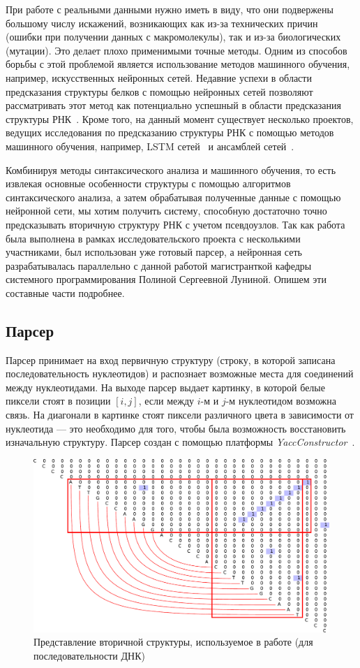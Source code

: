 \documentclass[14pt]{matmex-diploma-custom}
\begin{document}
При работе с реальными данными нужно иметь в виду, что они подвержены большому числу искажений, возникающих как из-за технических причин (ошибки при получении данных с макромолекулы), так и из-за биологических (мутации). Это делает плохо применимыми точные методы. Одним из способов борьбы с этой проблемой является использование методов машинного обучения, например, искусственных нейронных сетей. Недавние успехи в области предсказания структуры белков с помощью нейронных сетей позволяют рассматривать этот метод как потенциально успешный в области предсказания структуры РНК~\cite{Wang073239}. Кроме того, на данный момент существует несколько проектов, ведущих исследования по предсказанию структуры РНК с помощью методов машинного обучения, например, LSTM сетей~\cite{lstmnetwork} и ансамблей сетей~\cite{ensemblenetwork}.\par  
Комбинируя методы синтаксического анализа и машинного обучения, то есть извлекая основные особенности структуры с помощью алгоритмов синтаксического анализа, а затем обрабатывая полученные данные с помощью нейронной сети, мы хотим получить систему, способную достаточно точно предсказывать вторичную структуру РНК с учетом псевдоузлов. Так как работа была выполнена в рамках исследовательского проекта с несколькими участниками, был использован уже готовый парсер, а нейронная сеть разрабатывалась параллельно с данной работой магистранткой кафедры системного программирования Полиной Сергеевной Луниной. Опишем эти составные части подробнее.
\subsection{Парсер}
Парсер принимает на вход первичную структуру (строку, в которой записана последовательность нуклеотидов) и распознает возможные места для соединений между нуклеотидами. На выходе парсер выдает картинку, в которой белые пиксели стоят в позиции $[i,j]$, если между $i$-м и $j$-м нуклеотидом возможна связь. На диагонали в картинке стоят пиксели различного цвета в зависимости от нуклеотида --- это необходимо для того, чтобы была возможность восстановить изначальную структуру. Парсер создан с помощью платформы {\it YaccConstructor}~\cite{yacc}.
\begin{figure}[h]
	\centering
	\captionsetup{justification=centering}
	\includegraphics[scale=0.6]{pics/4.pdf}
	\caption{Представление вторичной структуры, используемое в работе (для последовательности ДНК)~\cite{semyonandpolina}}
	\label{fig:Структура}
\end{figure}
\end{document}
